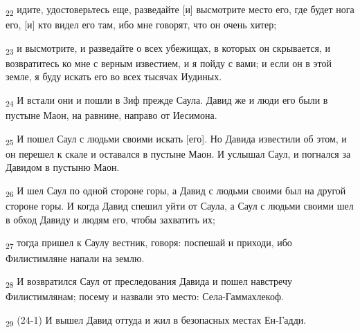 \begin{tcolorbox}
\textsubscript{22} идите, удостоверьтесь еще, разведайте [и] высмотрите место его, где будет нога его, [и] кто видел его там, ибо мне говорят, что он очень хитер;
\end{tcolorbox}
\begin{tcolorbox}
\textsubscript{23} и высмотрите, и разведайте о всех убежищах, в которых он скрывается, и возвратитесь ко мне с верным известием, и я пойду с вами; и если он в этой земле, я буду искать его во всех тысячах Иудиных.
\end{tcolorbox}
\begin{tcolorbox}
\textsubscript{24} И встали они и пошли в Зиф прежде Саула. Давид же и люди его были в пустыне Маон, на равнине, направо от Иесимона.
\end{tcolorbox}
\begin{tcolorbox}
\textsubscript{25} И пошел Саул с людьми своими искать [его]. Но Давида известили об этом, и он перешел к скале и оставался в пустыне Маон. И услышал Саул, и погнался за Давидом в пустыню Маон.
\end{tcolorbox}
\begin{tcolorbox}
\textsubscript{26} И шел Саул по одной стороне горы, а Давид с людьми своими был на другой стороне горы. И когда Давид спешил уйти от Саула, а Саул с людьми своими шел в обход Давиду и людям его, чтобы захватить их;
\end{tcolorbox}
\begin{tcolorbox}
\textsubscript{27} тогда пришел к Саулу вестник, говоря: поспешай и приходи, ибо Филистимляне напали на землю.
\end{tcolorbox}
\begin{tcolorbox}
\textsubscript{28} И возвратился Саул от преследования Давида и пошел навстречу Филистимлянам; посему и назвали это место: Села-Гаммахлекоф.
\end{tcolorbox}
\begin{tcolorbox}
\textsubscript{29} (24-1) И вышел Давид оттуда и жил в безопасных местах Ен-Гадди.
\end{tcolorbox}
